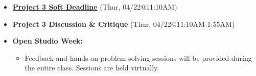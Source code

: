 \def\dMon{Mon, 04/19}
\def\dTues{Tues, 04/20}
\def\dWed{Wed, 04/21}
\def\dThur{Thur, 04/22}
\def\dFri{Fri, 04/23}
\def\dSat{Sat, 04/24}
\def\dSun{Sun, 04/25}
\placeDate





% 
\begin{itemize}[noitemsep,topsep=0pt,leftmargin=*]
    \item \textcolor{defaultColor}{\ul{\textbf{Project 3 Soft Deadline}} (\dThur @11:10AM)}
    \item \textcolor{defaultColor}{\textbf{Project 3 Discussion \& Critique} (\dThur @11:10AM-1:55AM)}
    \item \textbf{Open Studio Week:}
    \begin{itemize}
        \item Feedback and hands-on problem-solving sessions will be provided during the entire class. Sessions are held virtually. 
    \end{itemize}
\end{itemize}